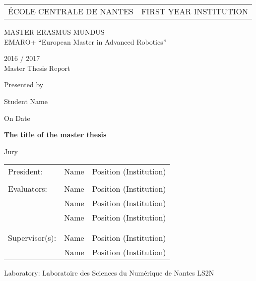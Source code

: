 \thispagestyle{empty}

\def\lskip{\vspace{0.5cm}}


\begin{tabular}{p{7cm}p{8cm}}
ÉCOLE CENTRALE DE NANTES
&
\raggedleft FIRST YEAR INSTITUTION	%
\end{tabular}

\vspace{2cm}


\begin{center} \large\sc MASTER ERASMUS MUNDUS \\ \normalsize{EMARO+ ``European Master in Advanced Robotics''} \end{center}


\begin{center}
	2016 / 2017\\
	\lskip
	Master Thesis Report
	\lskip
	
	Presented by \lskip 
	
	Student Name \lskip
	
	On Date \lskip\lskip
	
	{\Large \textbf{The title of the master thesis}}
	
	\vfill

Jury \lskip
		
	\end{center}
	


\begin{tabular}{p{3cm}p{7cm}p{5cm} }
 President: & Name & Position (Institution) \\ & & \\ 
 Evaluators: & Name & Position (Institution) \\
	      & Name & Position (Institution) \\ 
	      & Name & Position (Institution) \\ & & \\  & & \\ 
  Supervisor(s):  & Name & Position (Institution) \\
		  & Name & Position (Institution) 
\end{tabular}

\lskip

\begin{flushleft}
 Laboratory: Laboratoire des Sciences du Numérique de Nantes LS2N
\end{flushleft}

\newpage
\thispagestyle{empty}
\null
\newpage
\addtocounter{page}{-1}
\pagestyle{fancy}
